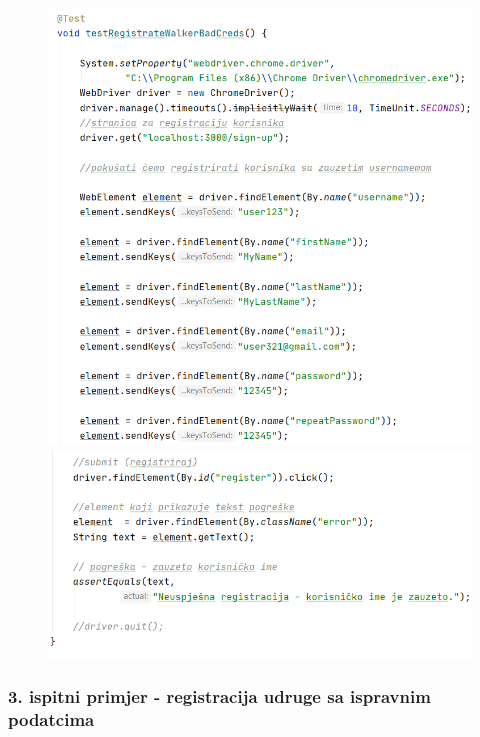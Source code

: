 			 \begin{figure}[H]
			 	\includegraphics[scale=0.75]{slike/Selenium2.1.PNG}
			 	\hspace*{0.15in}
			 	\includegraphics[scale=0.75]{slike/Selenium2.2.PNG} %
			 	\centering
			 \end{figure}
		 
		 
		   \subsubsection{3. ispitni primjer - registracija udruge sa ispravnim podatcima}
		 
